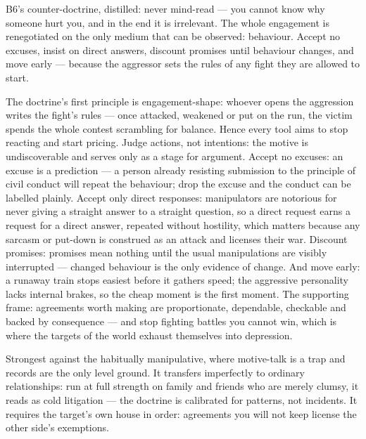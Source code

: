 \begin{core}
B6's counter-doctrine, distilled: never mind-read --- you cannot know why someone hurt you, and in the end it is irrelevant. The whole engagement is renegotiated on the only medium that can be observed: behaviour. Accept no excuses, insist on direct answers, discount promises until behaviour changes, and move early --- because the aggressor sets the rules of any fight they are allowed to start.
\end{core}
\begin{mechanism}
The doctrine's first principle is engagement-shape: whoever opens the aggression writes the fight's rules --- once attacked, weakened or put on the run, the victim spends the whole contest scrambling for balance. Hence every tool aims to stop reacting and start pricing. Judge actions, not intentions: the motive is undiscoverable and serves only as a stage for argument. Accept no excuses: an excuse is a prediction --- a person already resisting submission to the principle of civil conduct will repeat the behaviour; drop the excuse and the conduct can be labelled plainly. Accept only direct responses: manipulators are notorious for never giving a straight answer to a straight question, so a direct request earns a request for a direct answer, repeated without hostility, which matters because any sarcasm or put-down is construed as an attack and licenses their war. Discount promises: promises mean nothing until the usual manipulations are visibly interrupted --- changed behaviour is the only evidence of change. And move early: a runaway train stops easiest before it gathers speed; the aggressive personality lacks internal brakes, so the cheap moment is the first moment. The supporting frame: agreements worth making are proportionate, dependable, checkable and backed by consequence --- and stop fighting battles you cannot win, which is where the targets of the world exhaust themselves into depression.
\end{mechanism}
\begin{conditions}
Strongest against the habitually manipulative, where motive-talk is a trap and records are the only level ground. It transfers imperfectly to ordinary relationships: run at full strength on family and friends who are merely clumsy, it reads as cold litigation --- the doctrine is calibrated for patterns, not incidents. It requires the target's own house in order: agreements you will not keep license the other side's exemptions.
\end{conditions}
